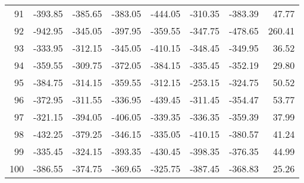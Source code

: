 \begin{longtable}{rrrrrrrr}
91 & -393.85 & -385.65 & -383.05 & -444.05 & -310.35 & -383.39 & 47.77  \\
92 & -942.95 & -345.05 & -397.95 & -359.55 & -347.75 & -478.65 & 260.41  \\
93 & -333.95 & -312.15 & -345.05 & -410.15 & -348.45 & -349.95 & 36.52  \\
94 & -359.55 & -309.75 & -372.05 & -384.15 & -335.45 & -352.19 & 29.80  \\
95 & -384.75 & -314.15 & -359.55 & -312.15 & -253.15 & -324.75 & 50.52  \\
96 & -372.95 & -311.55 & -336.95 & -439.45 & -311.45 & -354.47 & 53.77  \\
97 & -321.15 & -394.05 & -406.05 & -339.35 & -336.35 & -359.39 & 37.99  \\
98 & -432.25 & -379.25 & -346.15 & -335.05 & -410.15 & -380.57 & 41.24  \\
99 & -335.45 & -324.15 & -393.35 & -430.45 & -398.35 & -376.35 & 44.99  \\
100 & -386.55 & -374.75 & -369.65 & -325.75 & -387.45 & -368.83 & 25.26  \\

\end{longtable}

